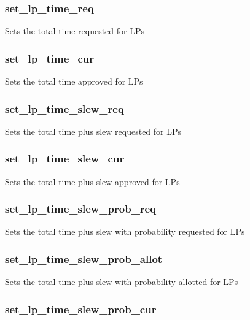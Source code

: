 \documentclass{article}
\begin{document}
\subsubsection*{set\_lp\_time\_req\label{Panel_set_lp_time_req}}


Sets the total time requested for LPs

\subsubsection*{set\_lp\_time\_cur\label{Panel_set_lp_time_cur}}


Sets the total time approved for LPs

\subsubsection*{set\_lp\_time\_slew\_req\label{Panel_set_lp_time_slew_req}}


Sets the total time plus slew requested for LPs

\subsubsection*{set\_lp\_time\_slew\_cur\label{Panel_set_lp_time_slew_cur}}


Sets the total time plus slew approved for LPs

\subsubsection*{set\_lp\_time\_slew\_prob\_req\label{Panel_set_lp_time_slew_prob_req}}


Sets the total time plus slew with probability requested for LPs

\subsubsection*{set\_lp\_time\_slew\_prob\_allot\label{Panel_set_lp_time_slew_prob_allot}}


Sets the total time plus slew with probability allotted for LPs

\subsubsection*{set\_lp\_time\_slew\_prob\_cur\label{Panel_set_lp_time_slew_prob_cur}}
\end{document}
